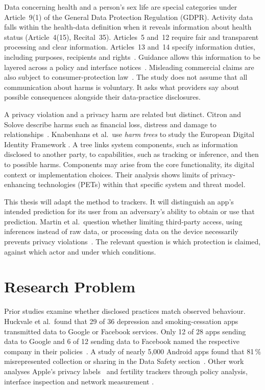 \documentclass[sigconf,nonacm,natbib=false]{acmart}
\begin{document}
Data concerning health and a person's sex life are special categories under
Article~9(1) of the General Data Protection Regulation (GDPR). Activity data
falls within the health-data definition when
it reveals information about health status (Article~4(15), Recital~35).
Articles~5 and~12 require fair and transparent processing and clear information.
Articles~13 and~14 specify information duties, including purposes, recipients
and rights~\parencite{gdpr2016}. Guidance allows this information to be layered
across a policy and interface notices~\parencite{wp292018transparency}. Misleading commercial claims are also subject to
consumer-protection law~\parencite{ucpd2005}. The study does not assume that
all communication about harms is voluntary. It asks what providers say about
possible consequences alongside their data-practice disclosures.

A privacy violation and a privacy harm are related but distinct. Citron and
Solove describe harms such as financial loss, distress and damage to
relationships~\parencite{citron2021harms}. Knabenhans et al.\ use \emph{harm
trees} to study the European Digital Identity Framework
\parencite[\S4.1]{knabenhans2026harms}. A tree links system components, such as
information disclosed to another party, to capabilities, such as tracking or
inference, and then to possible harms. Components may arise from the core
functionality, its digital context or implementation choices. Their analysis
shows limits of privacy-enhancing technologies (PETs) within that specific
system and threat model.

This thesis will adapt the method to trackers. It will distinguish an app's
intended prediction for its user from an adversary's ability to obtain or use
that prediction. Martin et al.\ question whether limiting
third-party access, using inferences instead of raw data, or processing data on
the device necessarily prevents privacy violations~\parencite{martin2025cookies}.
The relevant question is which protection is claimed, against which actor and
under which conditions.

\section{Research Problem}

Prior studies examine whether disclosed practices match observed behaviour.
Huckvale et al.\ found that 29 of 36 depression and smoking-cessation apps
transmitted data to Google or Facebook services. Only 12 of 28 apps sending
data to Google and 6 of 12 sending data to Facebook named the respective
company in their policies~\parencite{huckvale2019assessment}. A study of nearly
5{,}000 Android apps found that 81\,\% misrepresented collection or sharing in
the Data Safety section~\parencite{arkalakis2024abandon}. Other work analyses
Apple's privacy labels~\parencite{li2022ios} and fertility trackers through
policy analysis, interface inspection and network measurement
\parencite{shipp2020period,malki2024exploring,hudig2025intimate}.
\end{document}
